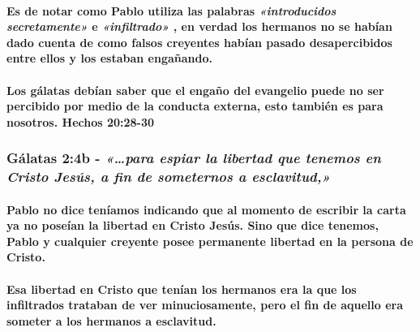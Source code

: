 \documentclass[11a pt,twoside]{article}
\newcommand{\scripture}[1]{%
  {\fontsize{12pt}{16pt}\selectfont\ScriptureFont\itshape #1}%
}
\let\oldsubsubsection\subsubsection
\renewcommand{\subsubsection}{\needspace{4\baselineskip}\oldsubsubsection}
\let\oldparagraph\paragraph
\renewcommand{\paragraph}{\needspace{3\baselineskip}\oldparagraph}
\begin{document}
\paragraph{\texorpdfstring{Es de notar como Pablo utiliza las palabras
\scripture{«introducidos secretamente»} e \scripture{«infiltrado»}, en
verdad los hermanos no se habían dado cuenta de como falsos creyentes
habían pasado desapercibidos entre ellos y los estaban
engañando.}{Es de notar como Pablo utiliza las palabras  e , en verdad los hermanos no se habían dado cuenta de como falsos creyentes habían pasado desapercibidos entre ellos y los estaban engañando.}}\label{es-de-notar-como-pablo-utiliza-las-palabras-introducidos-secretamente-e-infiltrado-en-verdad-los-hermanos-no-se-habuxedan-dado-cuenta-de-como-falsos-creyentes-habuxedan-pasado-desapercibidos-entre-ellos-y-los-estaban-engauxf1ando.}

\paragraph{Los gálatas debían saber que el engaño del evangelio puede no
ser percibido por medio de la conducta externa, esto también es para
nosotros. Hechos
20:28-30}\label{los-guxe1latas-debuxedan-saber-que-el-engauxf1o-del-evangelio-puede-no-ser-percibido-por-medio-de-la-conducta-externa-esto-tambiuxe9n-es-para-nosotros.-hechos-2028-30}

\subsubsection{\texorpdfstring{Gálatas 2:4b -
\scripture{«…para espiar la libertad que tenemos en Cristo Jesús, a fin de someternos a esclavitud,»}}{Gálatas 2:4b - }}\label{guxe1latas-24b---para-espiar-la-libertad-que-tenemos-en-cristo-jesuxfas-a-fin-de-someternos-a-esclavitud}

\paragraph{Pablo no dice teníamos indicando que al momento de escribir
la carta ya no poseían la libertad en Cristo Jesús. Sino que dice
tenemos, Pablo y cualquier creyente posee permanente libertad en la
persona de
Cristo.}\label{pablo-no-dice-tenuxedamos-indicando-que-al-momento-de-escribir-la-carta-ya-no-poseuxedan-la-libertad-en-cristo-jesuxfas.-sino-que-dice-tenemos-pablo-y-cualquier-creyente-posee-permanente-libertad-en-la-persona-de-cristo.}

\paragraph{Esa libertad en Cristo que tenían los hermanos era la que los
infiltrados trataban de ver minuciosamente, pero el fin de aquello era
someter a los hermanos a
esclavitud.}\label{esa-libertad-en-cristo-que-tenuxedan-los-hermanos-era-la-que-los-infiltrados-trataban-de-ver-minuciosamente-pero-el-fin-de-aquello-era-someter-a-los-hermanos-a-esclavitud.}
\end{document}
